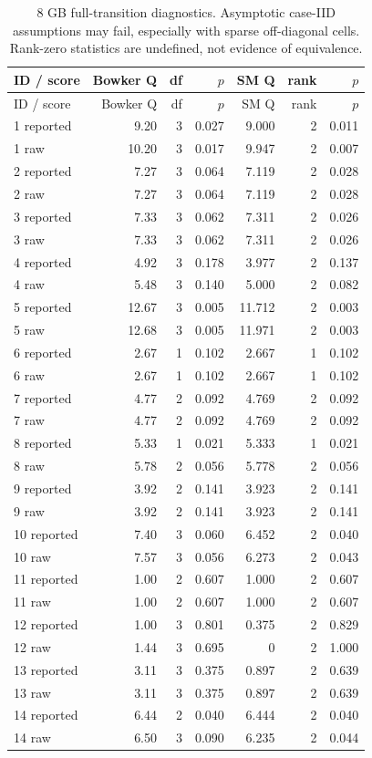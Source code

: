 {\small\setlength{\tabcolsep}{3pt}\begin{longtable}{lrrrrrr}
\caption{8 GB full-transition diagnostics. Asymptotic case-IID assumptions may fail, especially with sparse off-diagonal cells. Rank-zero statistics are undefined, not evidence of equivalence.}\\
ID / score & Bowker Q & df & $p$ & SM Q & rank & $p$\\\toprule\endfirsthead
ID / score & Bowker Q & df & $p$ & SM Q & rank & $p$\\\toprule\endhead
1 reported & 9.20 & 3 & 0.027 & 9.000 & 2 & 0.011\\
1 raw & 10.20 & 3 & 0.017 & 9.947 & 2 & 0.007\\
2 reported & 7.27 & 3 & 0.064 & 7.119 & 2 & 0.028\\
2 raw & 7.27 & 3 & 0.064 & 7.119 & 2 & 0.028\\
3 reported & 7.33 & 3 & 0.062 & 7.311 & 2 & 0.026\\
3 raw & 7.33 & 3 & 0.062 & 7.311 & 2 & 0.026\\
4 reported & 4.92 & 3 & 0.178 & 3.977 & 2 & 0.137\\
4 raw & 5.48 & 3 & 0.140 & 5.000 & 2 & 0.082\\
5 reported & 12.67 & 3 & 0.005 & 11.712 & 2 & 0.003\\
5 raw & 12.68 & 3 & 0.005 & 11.971 & 2 & 0.003\\
6 reported & 2.67 & 1 & 0.102 & 2.667 & 1 & 0.102\\
6 raw & 2.67 & 1 & 0.102 & 2.667 & 1 & 0.102\\
7 reported & 4.77 & 2 & 0.092 & 4.769 & 2 & 0.092\\
7 raw & 4.77 & 2 & 0.092 & 4.769 & 2 & 0.092\\
8 reported & 5.33 & 1 & 0.021 & 5.333 & 1 & 0.021\\
8 raw & 5.78 & 2 & 0.056 & 5.778 & 2 & 0.056\\
9 reported & 3.92 & 2 & 0.141 & 3.923 & 2 & 0.141\\
9 raw & 3.92 & 2 & 0.141 & 3.923 & 2 & 0.141\\
10 reported & 7.40 & 3 & 0.060 & 6.452 & 2 & 0.040\\
10 raw & 7.57 & 3 & 0.056 & 6.273 & 2 & 0.043\\
11 reported & 1.00 & 2 & 0.607 & 1.000 & 2 & 0.607\\
11 raw & 1.00 & 2 & 0.607 & 1.000 & 2 & 0.607\\
12 reported & 1.00 & 3 & 0.801 & 0.375 & 2 & 0.829\\
12 raw & 1.44 & 3 & 0.695 & 0 & 2 & 1.000\\
13 reported & 3.11 & 3 & 0.375 & 0.897 & 2 & 0.639\\
13 raw & 3.11 & 3 & 0.375 & 0.897 & 2 & 0.639\\
14 reported & 6.44 & 2 & 0.040 & 6.444 & 2 & 0.040\\
14 raw & 6.50 & 3 & 0.090 & 6.235 & 2 & 0.044\\
\bottomrule\end{longtable}}